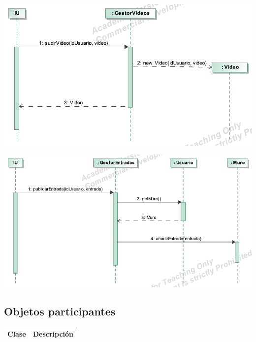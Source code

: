 \documentclass[12pt, a4paper, titlepage]{article}
\begin{document}
\begin{center}
	\includegraphics{Imagenes/OperacionSubirVideo}
\end{center}

\begin{center}
	\includegraphics{Imagenes/OperacionPublicarEntrada.pdf}
\end{center}
\subsection{Objetos participantes}

\begin{center}

\begin{tabular}{|c|p{14cm}|}
	\hline
	\textbf{Clase} & \textbf{Descripción}\\ \hline
\end{tabular}

\end{center}

\end{document}
